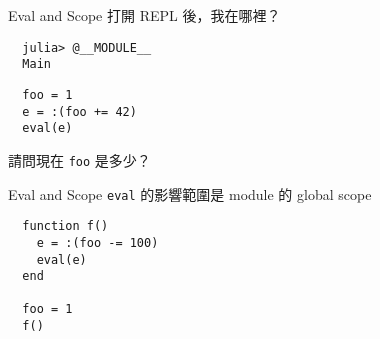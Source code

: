\documentclass[14pt]{beamer}
\begin{document}
\begin{frame}[fragile]{Eval and Scope}
  打開 REPL 後，我在哪裡？

  \pause

\begin{lstlisting}
  julia> @__MODULE__
  Main
\end{lstlisting}

  \pause

\begin{lstlisting}
  foo = 1
  e = :(foo += 42)
  eval(e)
\end{lstlisting}

  請問現在 \texttt{foo} 是多少？
\end{frame}

\begin{frame}[fragile]{Eval and Scope}
  \texttt{eval} 的影響範圍是 module 的 global scope

\begin{lstlisting}
  function f()
    e = :(foo -= 100)
    eval(e)
  end

  foo = 1
  f()
\end{lstlisting}
\end{frame}
\end{document}
